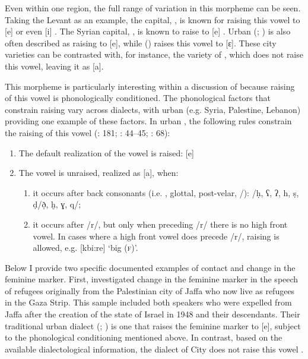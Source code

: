 \documentclass[output=paper]{langsci/langscibook}
\begin{document}
Even within one region, the full range of variation in this morpheme can be seen. Taking the Levant as an example, the  capital, , is known for raising this vowel to [e] or even [i] \citep{Naïm2011}. The Syrian capital, , is known to raise to [e] \citep{Lentin2011Damascus}. Urban  (\citealt{Rosenhouse2011}; \citealt{Shahin2011}) is also often described as raising to [e], while  (\citealt{Al-Wer2007}) raises this vowel to [ɛ]. These city varieties can be contrasted with, for instance, the variety of  \citep{Woidich2011}, which does not raise this vowel, leaving it as [a]. 

  This morpheme is particularly interesting within a discussion of  because raising of this vowel is phonologically conditioned. The phonological factors that constrain raising vary across dialects, with urban   (e.g. Syria, Palestine, Lebanon) providing one example of these factors. In urban , the following rules constrain the raising of this vowel (\citealt{Grotzfeld1980}: 181; \citealt{Levin1994}: 44--45; \citealt{Al-Wer2007}: 68):
\begin{enumerate}
    \item The default realization of the vowel is raised: [e]
    \item The vowel is unraised, realized as [a], when:
    \begin{enumerate}
        \item   it occurs after back consonants (i.e. , glottal, post-velar, /): /ḥ, ʕ, ʔ, h, ṣ, ḍ/ð̣, ḫ, ɣ, q/;
        \item   it occurs after /r/, but only when preceding /r/ there is no   high front vowel. In cases where a high front vowel does   precede /r/, raising is allowed, e.g. [kbi:re] ‘big (\textsc{f})’.
    \end{enumerate}
\end{enumerate}

Below I provide two specific documented examples of contact and change in the feminine  marker. First, \citet{CotterHoresh2015} investigated change in the feminine  marker in the speech of refugees originally from the Palestinian city of Jaffa who now live as refugees in the Gaza Strip. This sample included both speakers who were expelled from Jaffa after the creation of the state of Israel in 1948 and their descendants. Their traditional urban  dialect (\citealt{Horesh2000}; \citealt{Shahin2011}) is one that raises the feminine  marker to [e], subject to the phonological conditioning mentioned above. In contrast, based on the available dialectological information, the dialect of  City does not raise this vowel \citep{Bergsträßer1915}. 
\end{document}
